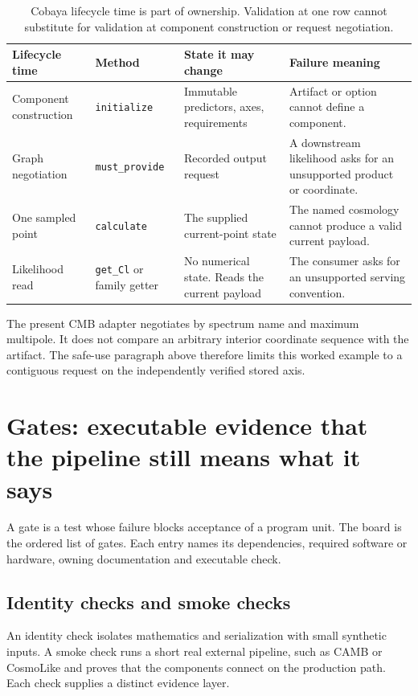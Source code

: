\documentclass[10pt,aps,prd,twocolumn,nofootinbib]{revtex4-2}
\newcommand{\code}[1]{\texttt{#1}}
\begin{document}
\begin{table}[t]
\centering
\begin{tabular}{p{}p{}p{}p{}}
\toprule
Lifecycle time & Method & State it may change & Failure meaning \\
\midrule
Component construction & \code{initialize} & Immutable predictors, axes,
requirements & Artifact or option cannot define a component.  \\
Graph negotiation & \code{must\_provide} & Recorded output request & A
downstream likelihood asks for an unsupported product or coordinate.  \\
One sampled point & \code{calculate} & The supplied current-point state & The
named cosmology cannot produce a valid current payload.  \\
Likelihood read & \code{get\_Cl} or family getter & No numerical state.  Reads
the current payload & The consumer asks for an unsupported serving convention.  \\
\bottomrule
\end{tabular}
\caption{Cobaya lifecycle time is part of ownership.  Validation at one row
cannot substitute for validation at component construction or request
negotiation.}
\end{table}

The present CMB adapter negotiates by spectrum name and maximum multipole.  It
does not compare an arbitrary interior coordinate sequence with the artifact.
The safe-use paragraph above therefore limits this worked example to a
contiguous request on the independently verified stored axis.

\section{Gates: executable evidence that the pipeline still means what it says}
\label{chap:gates}

A gate is a test whose failure blocks acceptance of a program unit.  The board
is the ordered list of gates.  Each entry names its dependencies, required
software or hardware, owning documentation and executable check.

\subsection{Identity checks and smoke checks}

An identity check isolates mathematics and serialization with small synthetic
inputs.  A smoke check runs a short real external pipeline, such as CAMB or
CosmoLike and proves that the components connect on the production path.  Each
check supplies a distinct evidence layer.
\end{document}
